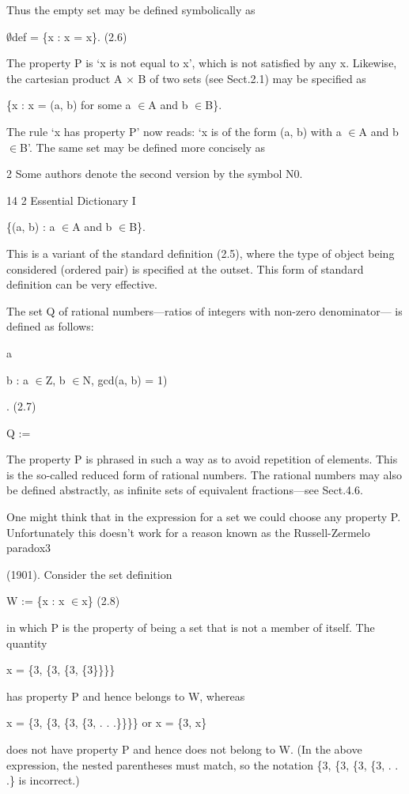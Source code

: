 \documentclass[11pt]{article}
\theoremstyle{plain}
\theoremstyle{definition}
\begin{document}
Thus the empty set may be defined symbolically as

$\emptyset$def = \{x : x = x\}. (2.6)

The property P is `x is not equal to x', which is not satisfied by any x. Likewise, the cartesian product A $\times$ B of two sets (see Sect.2.1) may be specified as

\{x : x = (a, b) for some a $\in$A and b $\in$B\}.

The rule `x has property P' now reads: `x is of the form (a, b) with a $\in$A and b $\in$B'. The same set may be defined more concisely as

2 Some authors denote the second version by the symbol N0.

14 2 Essential Dictionary I

\{(a, b) : a $\in$A and b $\in$B\}.

This is a variant of the standard definition (2.5), where the type of object being considered (ordered pair) is specified at the outset. This form of standard definition can be very effective.

The set Q of rational numbers---ratios of integers with non-zero denominator--- is defined as follows:

a

b : a $\in$Z, b $\in$N, gcd(a, b) = 1)

. (2.7)

Q :=

The property P is phrased in such a way as to avoid repetition of elements. This is the so-called reduced form of rational numbers. The rational numbers may also be defined abstractly, as infinite sets of equivalent fractions---see Sect.4.6.

One might think that in the expression for a set we could choose any property P. Unfortunately this doesn't work for a reason known as the Russell-Zermelo paradox3

(1901). Consider the set definition

W := \{x : x $\in$x\} (2.8)

in which P is the property of being a set that is not a member of itself. The quantity

x = \{3, \{3, \{3, \{3\}\}\}\}

has property P and hence belongs to W, whereas

x = \{3, \{3, \{3, \{3, . . .\}\}\}\} or x = \{3, x\}

does not have property P and hence does not belong to W. (In the above expression, the nested parentheses must match, so the notation \{3, \{3, \{3, \{3, . . .\} is incorrect.)
\end{document}
